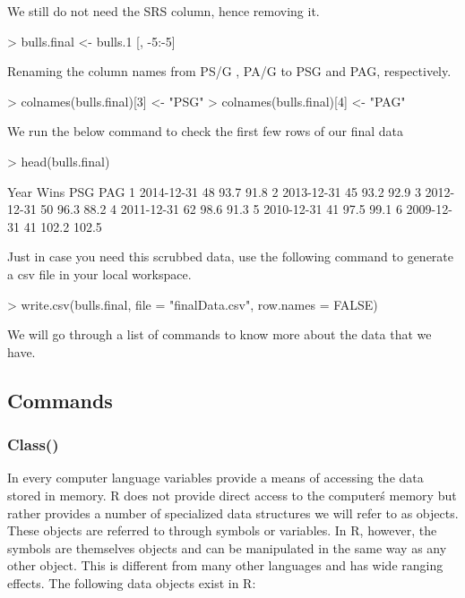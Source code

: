 \documentclass[a4paper]{article}
\begin{document}
We still do not need the SRS column, hence removing it.
\begin{Schunk}
\begin{Sinput}
> bulls.final <- bulls.1 [, -5:-5]
\end{Sinput}
\end{Schunk}

Renaming the column names from PS/G , PA/G to PSG and PAG, respectively.

\begin{Schunk}
\begin{Sinput}
> colnames(bulls.final)[3] <- "PSG"
> colnames(bulls.final)[4] <- "PAG"
\end{Sinput}
\end{Schunk}

We run the below command to check the first few rows of our final data
\begin{Schunk}
\begin{Sinput}
> head(bulls.final)
\end{Sinput}
\begin{Soutput}
        Year Wins   PSG   PAG
1 2014-12-31   48  93.7  91.8
2 2013-12-31   45  93.2  92.9
3 2012-12-31   50  96.3  88.2
4 2011-12-31   62  98.6  91.3
5 2010-12-31   41  97.5  99.1
6 2009-12-31   41 102.2 102.5
\end{Soutput}
\end{Schunk}

Just in case you need this scrubbed data, use the following command to generate a csv file in your local workspace.
\begin{Schunk}
\begin{Sinput}
> write.csv(bulls.final, file = "finalData.csv", row.names = FALSE)
\end{Sinput}
\end{Schunk}


\vspace{1cm}
We will go through a list of commands to know more about the data that we have.

\subsection{Commands}
\subsubsection{Class()}

In every computer language variables provide a means of accessing the data stored in memory. R does not provide direct access to the computer\'s memory but rather provides a number of specialized data structures we will refer to as objects. These objects are referred to through symbols or variables. In R, however, the symbols are themselves objects and can be manipulated in the same way as any other object. This is different from many other languages and has wide ranging effects. 
The following data objects exist in R:
\end{document}
